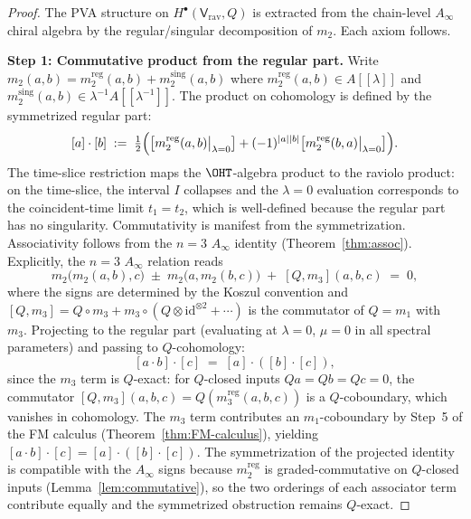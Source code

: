 \begin{proof}
The PVA structure on $H^\bullet(\mathsf{V}_{\mathrm{rav}}, Q)$ is extracted from the chain-level $A_\infty$ chiral algebra by the regular/singular decomposition of $m_2$. Each axiom follows.

\medskip\noindent\textbf{Step 1: Commutative product from the regular part.}
Write $m_2(a,b) = m_2^{\mathrm{reg}}(a,b) + m_2^{\mathrm{sing}}(a,b)$ where $m_2^{\mathrm{reg}}(a,b)\in A[[\lambda]]$ and $m_2^{\mathrm{sing}}(a,b)\in \lambda^{-1}A[[\lambda^{-1}]]$. The product on cohomology is defined by the symmetrized regular part:
\[
 [a]\cdot [b] \;:=\; \tfrac{1}{2}\Bigl(\bigl[m_2^{\mathrm{reg}}(a,b)\big|_{\lambda=0}\bigr] + (-1)^{|a||b|}\bigl[m_2^{\mathrm{reg}}(b,a)\big|_{\lambda=0}\bigr]\Bigr).
\]
The time-slice restriction maps the $\OHT$-algebra product to the raviolo product: on the time-slice, the interval $I$ collapses and the $\lambda=0$ evaluation corresponds to the coincident-time limit $t_1=t_2$, which is well-defined because the regular part has no singularity. Commutativity is manifest from the symmetrization. Associativity follows from the $n=3$ $A_\infty$ identity (Theorem~\ref{thm:assoc}). Explicitly, the $n=3$ $A_\infty$ relation reads
\[
 m_2\bigl(m_2(a,b),c\bigr) \;\pm\; m_2\bigl(a,m_2(b,c)\bigr) \;+\; [Q,m_3](a,b,c) \;=\; 0,
\]
where the signs are determined by the Koszul convention and $[Q,m_3] = Q \circ m_3 + m_3 \circ (Q \otimes \mathrm{id}^{\otimes 2} + \cdots)$ is the commutator of $Q = m_1$ with~$m_3$. Projecting to the regular part (evaluating at $\lambda = 0$, $\mu = 0$ in all spectral parameters) and passing to $Q$-cohomology:
\[
 [a \cdot b] \cdot [c] \;=\; [a] \cdot ([b] \cdot [c]),
\]
since the $m_3$ term is $Q$-exact: for $Q$-closed inputs
$Qa = Qb = Qc = 0$, the commutator
$[Q,m_3](a,b,c) = Q(m_3^{\mathrm{reg}}(a,b,c))$
is a $Q$-coboundary, which vanishes in cohomology.
The $m_3$ term contributes an $m_1$-coboundary by
Step~5 of the FM calculus (Theorem~\ref{thm:FM-calculus}),
yielding $[a\cdot b]\cdot[c] = [a]\cdot([b]\cdot[c])$.
The symmetrization of the projected identity is compatible
with the $A_\infty$ signs because $m_2^{\mathrm{reg}}$ is
graded-commutative on $Q$-closed inputs
(Lemma~\ref{lem:commutative}), so the two orderings of each
associator term contribute equally and the symmetrized
obstruction remains $Q$-exact.


\end{proof}
